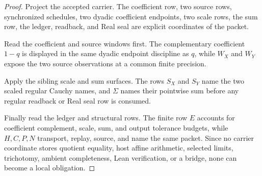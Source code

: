 \begin{proof}
Project the accepted carrier. The coefficient row, two source rows, synchronized schedules, two dyadic coefficient endpoints, two scale rows, the sum row, the ledger, readback, and Real seal are explicit coordinates of the packet.

Read the coefficient and source windows first. The complementary coefficient $1-q$ is displayed in the same dyadic endpoint discipline as $q$, while $W_X$ and $W_Y$ expose the two source observations at a common finite precision.

Apply the sibling scale and sum surfaces. The rows $S_X$ and $S_Y$ name the two scaled regular Cauchy names, and $\Sigma$ names their pointwise sum before any regular readback or Real seal row is consumed.

Finally read the ledger and structural rows. The finite row $E$ accounts for coefficient complement, scale, sum, and output tolerance budgets, while $H,C,P,N$ transport, replay, source, and name the same packet. Since no carrier coordinate stores quotient equality, host affine arithmetic, selected limits, trichotomy, ambient completeness, Lean verification, or a bridge, none can become a local obligation.
\end{proof}

